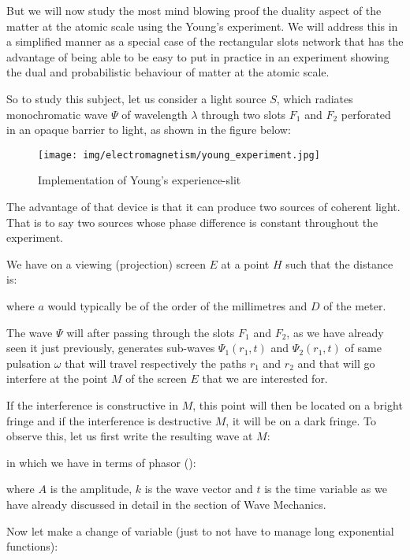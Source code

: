 	But we will now study the most mind blowing proof the duality aspect of the matter at the atomic scale using the Young's experiment. We will address this in a simplified manner as a special case of the rectangular slots network that has the advantage of being able to be easy to put in practice in an experiment showing the dual and probabilistic behaviour of matter at the atomic scale.

	So to study this subject, let us consider a light source $S$, which radiates monochromatic wave $\Psi$ of wavelength $\lambda$ through two slots $F_1$ and $F_2$ perforated  in an opaque barrier to light, as shown in the figure below:
	\begin{figure}[H]
		\centering
		\texttt{[image: img/electromagnetism/young\_experiment.jpg]}
		\caption{Implementation of Young's experience-slit}
	\end{figure}
	
	\begin{tcolorbox}[title=Remark,colframe=black,arc=10pt]
	The advantage of that device is that it can produce two sources of coherent light. That is to say two sources whose phase difference is constant throughout the experiment.
	\end{tcolorbox}
	We have on a viewing (projection) screen $E$ at a point $H$ such that the distance is:
	
	where $a$ would typically be of the order of the millimetres and $D$ of the meter.
	
	The wave $\Psi$ will after passing through the slots $F_1$ and $F_2$, as we have already seen it just previously, generates sub-waves $\Psi_1(r_1,t)$ and $\Psi_2(r_1,t)$ of same pulsation $\omega$ that will travel respectively the paths $r_1$ and $r_2$ and that will go interfere at the point $M$ of the screen $E$ that we are interested for.
	
	If the interference is constructive in $M$, this point will then be located on a bright fringe and if the interference is destructive $M$, it will be on a dark fringe. To observe this, let us first write the resulting wave at $M$:
	
	in which we have in terms of phasor ():
	
	where $A$ is the amplitude, $k$ is the wave vector and $t$ is the time variable as we have already discussed in detail in the section of Wave Mechanics.

	Now let make a change of variable (just to not have to manage long exponential functions):
	
